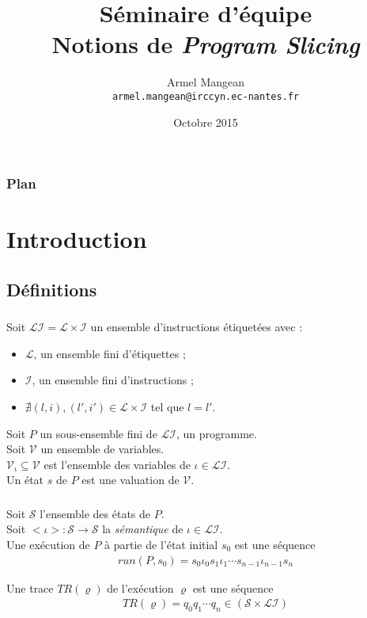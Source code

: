 \documentclass{beamer}
\title{%
  Séminaire d'équipe \\
  {\bf Notions de \emph{Program Slicing}}}
\author{%
  Armel Mangean \\
  {\small\tt armel.mangean@irccyn.ec-nantes.fr}}
\institute{%
  IRCCyN, équipe Sytème Temps-Réel \\
  École Centrale de Nantes}
\date{Octobre 2015}
\begin{document}
  \begin{frame}
    \titlepage
  \end{frame}

  \begin{frame}
    \frametitle{Plan}
    \tableofcontents
  \end{frame}

  \section{Introduction}
    \subsection{Définitions} %
      \begin{frame}
        \frametitle{\subsecname}
        
        Soit $\mathcal{LI} = \mathcal{L} \times \mathcal{I}$ un ensemble
        d'instructions étiquetées avec :
        \begin{itemize}
          \item $\mathcal{L}$, un ensemble fini d'étiquettes ;
          \item $\mathcal{I}$, un ensemble fini d'instructions ;
            \item $\nexists (l,i),(l',i') \in \mathcal{L} \times \mathcal{I}$
              tel que $l = l'$.
        \end{itemize}
        \vspace{1em}\pause

        Soit $P$ un sous-ensemble fini de $\mathcal{LI}$, un programme.
        \\ Soit $\mathcal{V}$ un ensemble de variables.
        \\ $\mathcal{V}_{\iota} \subseteq \mathcal{V}$ est l'ensemble des
        variables de $\iota \in \mathcal{LI}$.
        \\ Un état $s$ de $P$ est une valuation de $\mathcal{V}$.
      \end{frame}
      
      \begin{frame}
        \frametitle{\subsecname}
        Soit $\mathcal{S}$ l'ensemble des états de $P$.
        \\ Soit $<\iota>: \mathcal{S} \rightarrow \mathcal{S}$ la
        \emph{sémantique} de $\iota \in \mathcal{LI}$.
        \\ Une exécution de $P$ à partie de l'état initial $s_0$ est une séquence
        \begin{align*}
          run(P,s_0) = s_0 \iota_0 s_1 \iota_1 \cdots s_{n-1} \iota_{n-1} s_n
        \end{align*}
        \vspace{1em}\pause

        
        Une trace $TR(\varrho)$ de l'exécution $\varrho$ est une séquence
        \begin{align*}
          TR(\varrho) = q_0 q_1 \cdots q_n \in (\mathcal{S} \times \mathcal{LI})
        \end{align*}
      \end{frame}
\end{document}
